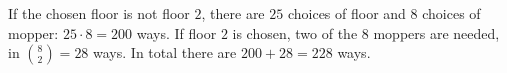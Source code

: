 If the chosen floor is not floor $2$, there are $25$ choices of floor and $8$ choices of mopper: $25\cdot8=200$ ways. If floor $2$ is chosen, two of the $8$ moppers are needed, in $\binom82=28$ ways. In total there are $200+28=\boxed{228}$ ways.
